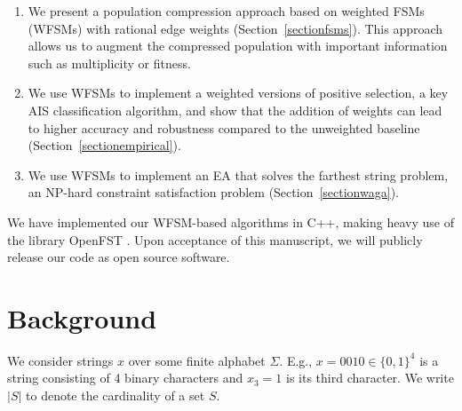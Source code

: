\documentclass{llncs}
\begin{document}
\begin{enumerate}
\item We present a population compression approach based on weighted FSMs (WFSMs) with rational
edge weights (Section~\ref{sectionfsms}). This approach allows us to augment the compressed population with important information such as multiplicity or fitness. 
\item We use WFSMs to implement a weighted versions of positive selection, a key AIS classification algorithm, and show that the addition of weights can lead to higher accuracy and robustness compared to the unweighted baseline (Section~\ref{sectionempirical}).
\item We use WFSMs to implement an EA that solves the farthest string problem, an NP-hard constraint satisfaction problem (Section~\ref{sectionwaga}).

\end{enumerate}


We have implemented our WFSM-based algorithms in C++, making heavy use of the library OpenFST \cite{openfst}. Upon acceptance of this manuscript, we will publicly release our code as open source software. %

\section{Background}

\label{sectionbackground}

We consider strings $x$ over some finite alphabet $\Sigma$.
E.g., $x=0010 \in \{0,1\}^4$ is a string consisting of 4 binary characters and $x_3=1$ is its third character.
We write $|S|$ to denote the cardinality of a set $S$.
\end{document}
